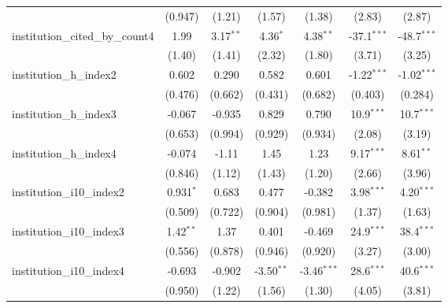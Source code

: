 \begin{tabular}{lcccccc}
                                         & (0.947)       & (1.21)        & (1.57)        & (1.38)        & (2.83)        & (2.87)\\   
   institution\_cited\_by\_count4        & 1.99          & 3.17$^{**}$   & 4.36$^{*}$    & 4.38$^{**}$   & -37.1$^{***}$ & -48.7$^{***}$\\   
                                         & (1.40)        & (1.41)        & (2.32)        & (1.80)        & (3.71)        & (3.25)\\   
   institution\_h\_index2                & 0.602         & 0.290         & 0.582         & 0.601         & -1.22$^{***}$ & -1.02$^{***}$\\   
                                         & (0.476)       & (0.662)       & (0.431)       & (0.682)       & (0.403)       & (0.284)\\   
   institution\_h\_index3                & -0.067        & -0.935        & 0.829         & 0.790         & 10.9$^{***}$  & 10.7$^{***}$\\   
                                         & (0.653)       & (0.994)       & (0.929)       & (0.934)       & (2.08)        & (3.19)\\   
   institution\_h\_index4                & -0.074        & -1.11         & 1.45          & 1.23          & 9.17$^{***}$  & 8.61$^{**}$\\   
                                         & (0.846)       & (1.12)        & (1.43)        & (1.20)        & (2.66)        & (3.96)\\   
   institution\_i10\_index2              & 0.931$^{*}$   & 0.683         & 0.477         & -0.382        & 3.98$^{***}$  & 4.20$^{***}$\\   
                                         & (0.509)       & (0.722)       & (0.904)       & (0.981)       & (1.37)        & (1.63)\\   
   institution\_i10\_index3              & 1.42$^{**}$   & 1.37          & 0.401         & -0.469        & 24.9$^{***}$  & 38.4$^{***}$\\   
                                         & (0.556)       & (0.878)       & (0.946)       & (0.920)       & (3.27)        & (3.00)\\   
   institution\_i10\_index4              & -0.693        & -0.902        & -3.50$^{**}$  & -3.46$^{***}$ & 28.6$^{***}$  & 40.6$^{***}$\\   
                                         & (0.950)       & (1.22)        & (1.56)        & (1.30)        & (4.05)        & (3.81)\\   

\end{tabular}
